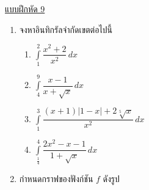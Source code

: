 \documentclass[hidelinks,12pt,a4paper]{article}
\newcommand{\nr}[2]{\sqrt[#1]{#2}}
\begin{document}
\vspace{3mm}
\underline{\large แบบฝึกหัด 9}
\begin{enumerate}
    \item จงหาอินทิกรัลจำกัดเขตต่อไปนี้
    \begin{multicols}{2}
        \begin{enumerate}
            \renewcommand{\labelenumii}{\arabic{enumii})}
            \item $\displaystyle\int\limits_1^2 \dfrac{x^2+2}{x^2}\,dx$
            \vspace{50mm}
            \item $\displaystyle\int\limits_4^9 \dfrac{x-1}{x+\sqrt{x}}\,dx$
            \item $\displaystyle\int\limits_1^3 \dfrac{(x+1)|1-x|+2\nr{5}{x}}{x^2}\,dx$
            \vspace{50mm}
            \item $\displaystyle\int\limits_{\scriptscriptstyle \frac{1}{4}}^4 \dfrac{2x^2-x-1}{1+\sqrt{x}}\,dx$
        \end{enumerate}
    \end{multicols}
    \newpage
    \item กำหนดกราฟของฟังก์ชัน $f$ ดังรูป 
    

\end{enumerate}
\end{document}

